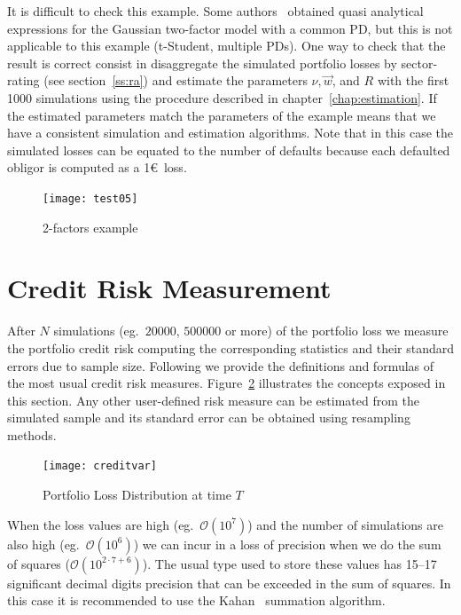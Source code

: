 \documentclass[11pt,fleqn]{book} %
\begin{document}
\begin{example}[2 factors]
	It is difficult to check this example. Some authors~\cite{cespedes:2002}
	obtained quasi analytical expressions for the Gaussian two-factor model 
	with a common PD, but this is not applicable to this example (t-Student, 
	multiple PDs).
	One way to check that the result is correct consist in disaggregate the
	simulated portfolio losses by sector-rating (see section~\ref{ss:ra}) and 
	estimate the parameters $\nu, \vec{w}$, and $R$ with the first 1000 
	simulations using the procedure described in chapter~\ref{chap:estimation}. 
	If the estimated parameters match the parameters of the example means that 
	we have a consistent simulation and estimation algorithms. Note that in 
	this case the simulated losses can be equated to the number of defaults 
	because each defaulted obligor is computed as a 1\euro\ loss.
	\begin{figure}[ht]
		\centering
		\texttt{[image: test05]}
		\caption{2-factors example}
		\label{fig:test05}
	\end{figure}
\end{example}

\section{Credit Risk Measurement}
\label{sec:riskm}

After $N$ simulations (eg.\ $20000$, $500000$ or more) of the portfolio loss
we measure the portfolio credit risk computing the corresponding statistics 
and their standard errors due to sample size. Following we provide the 
definitions and formulas of the most usual credit risk measures. 
Figure~\ref{fig:lossdistr} illustrates the concepts exposed in this section.
Any other user-defined risk measure can be estimated from the simulated 
sample and its standard error can be obtained using resampling methods.
\begin{figure}[!ht]
	\centering
	\texttt{[image: creditvar]}
	\caption{Portfolio Loss Distribution at time $T$}
	\label{fig:lossdistr}
\end{figure}

When the loss values are high (eg.\ $\mathcal{O}(10^7)$) and the number of 
simulations are also high (eg.\ $\mathcal{O}(10^6)$) we can incur in a loss of 
precision when we do the sum of squares ($\mathcal{O}(10^{2 \cdot 7 + 6})$). 
The usual type used to store these values has 15--17 significant decimal 
digits precision that can be exceeded in the sum of squares. In this case it 
is recommended to use the Kahan~\cite{kahan:1965} summation algorithm.
\end{document}
